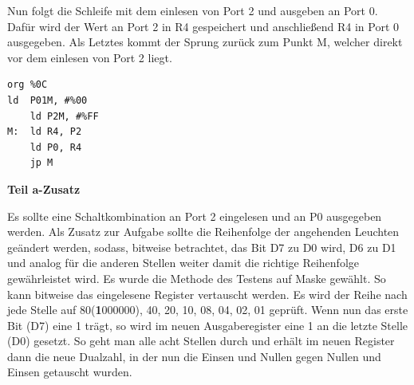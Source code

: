 Nun folgt die Schleife mit dem einlesen von Port 2 und ausgeben an Port 0. Dafür wird der Wert an Port 2 in R4 gespeichert  und anschließend R4 in Port 0 ausgegeben. Als Letztes kommt der Sprung zurück zum Punkt M, welcher direkt vor dem einlesen von Port 2 liegt.

\begin{verbatim}
org %0C
ld  P01M, #%00
	ld P2M, #%FF
M:	ld R4, P2
	ld P0, R4
	jp M
\end{verbatim}

\textbf{Teil a-Zusatz}

Es sollte eine Schaltkombination an Port 2 eingelesen und an P0 ausgegeben werden.
Als Zusatz zur Aufgabe sollte die Reihenfolge der angehenden Leuchten geändert werden, sodass, bitweise betrachtet, das Bit D7 zu D0 wird, D6 zu D1 und analog für die anderen Stellen weiter damit die richtige Reihenfolge gewährleistet wird.
Es wurde die Methode des Testens auf Maske gewählt. So kann bitweise das eingelesene Register vertauscht werden. Es wird der Reihe nach jede Stelle auf 80(\textbf{1}000000), 40, 20, 10, 08, 04, 02, 01 geprüft. Wenn nun das erste Bit (D7) eine 1 trägt, so wird im neuen Ausgaberegister eine 1 an die letzte Stelle (D0) gesetzt. So geht man alle acht Stellen durch und erhält im neuen Register dann die neue Dualzahl, in der nun die Einsen und Nullen gegen Nullen und Einsen getauscht wurden.

